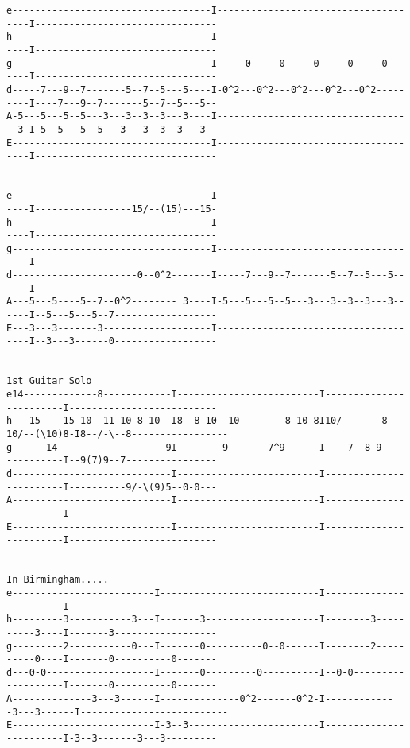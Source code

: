 \begin{verbatim}
e-----------------------------------I-------------------------------------I--------------------------------
h-----------------------------------I-------------------------------------I--------------------------------
g-----------------------------------I-----0-----0-----0-----0-----0-------I--------------------------------
d-----7---9--7-------5--7--5---5----I-0^2---0^2---0^2---0^2---0^2---------I----7---9--7-------5--7--5---5--
A-5---5---5--5---3---3--3--3---3----I-----------------------------------3-I-5--5---5--5---3---3--3--3---3--
E-----------------------------------I-------------------------------------I--------------------------------


e-----------------------------------I-------------------------------------I-----------------15/--(15)---15-
h-----------------------------------I-------------------------------------I--------------------------------
g-----------------------------------I-------------------------------------I--------------------------------
d----------------------0--0^2-------I-----7---9--7-------5--7--5---5------I--------------------------------
A---5---5----5--7--0^2-------- 3----I-5---5---5--5---3---3--3--3---3------I--5---5---5--7------------------
E---3---3-------3-------------------I-------------------------------------I--3---3------0------------------


1st Guitar Solo
e14-------------8------------I-------------------------I------------------------I--------------------------
h---15----15-10--11-10-8-10--I8--8-10--10--------8-10-8I10/-------8-10/--(\10)8-I8--/-\--8-----------------
g------14-------------------9I--------9-------7^9------I----7--8-9--------------I--9(7)9--7----------------
d----------------------------I-------------------------I------------------------I----------9/-\(9)5--0-0---
A----------------------------I-------------------------I------------------------I--------------------------
E----------------------------I-------------------------I------------------------I--------------------------


In Birmingham.....
e-------------------------I----------------------------I------------------------I--------------------------
h---------3-----------3---I-------3--------------------I--------3----------3----I-------3------------------
g---------2-----------0---I-------0----------0--0------I--------2----------0----I-------0----------0-------
d---0-0-------------------I-------0---------0----------I--0-0-------------------I-------0----------0-------
A--------------3---3------I--------------0^2-------0^2-I-------------3---3------I--------------------------
E-------------------------I-3--3-----------------------I------------------------I-3--3-------3---3---------



\end{verbatim}
